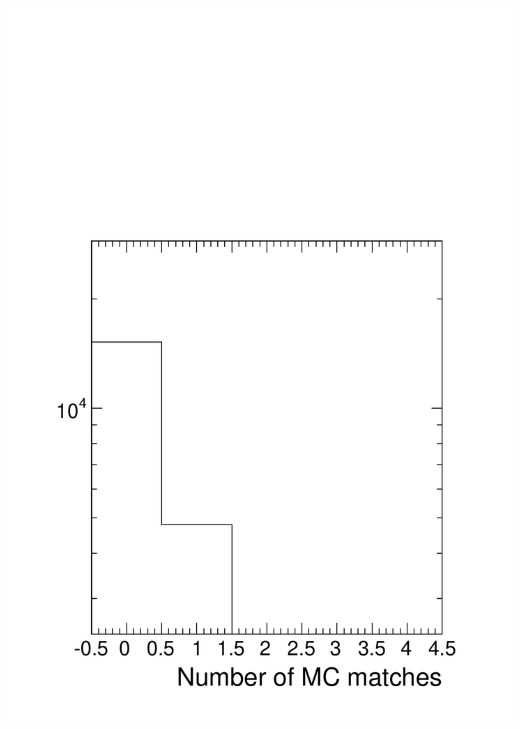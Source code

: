 \documentclass[compress]{beamer}
\begin{document}
\begin{frame}
\begin{columns}
\includegraphics[width=\linewidth]{nummatches_background.pdf}
\end{columns}
\end{frame}
\end{document}
